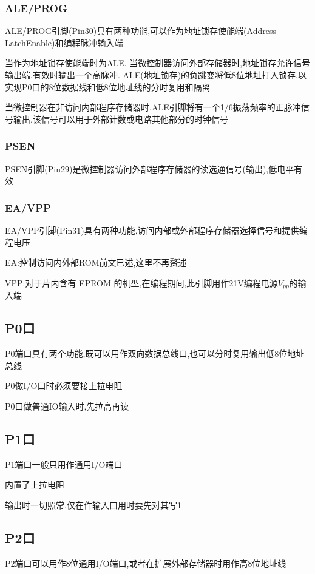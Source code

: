 \documentclass[12pt,a4paper,oneside]{ctexart}
\begin{document}
\subsubsection{ALE/PROG}
ALE/PROG引脚(Pin30)具有两种功能,可以作为地址锁存使能端(Address LatchEnable)和编程脉冲输入端

当作为地址锁存使能端时为ALE.
当微控制器访问外部存储器时,地址锁存允许信号输出端.有效时输出一个高脉冲.
ALE(地址锁存)的负跳变将低8位地址打入锁存.以实现P0口的8位数据线和低8位地址线的分时复用和隔离

当微控制器在非访问内部程序存储器时,ALE引脚将有一个1/6振荡频率的正脉冲信号输出,该信号可以用于外部计数或电路其他部分的时钟信号

\subsubsection{PSEN}
PSEN引脚(Pin29)是微控制器访问外部程序存储器的读选通信号(输出),低电平有效

\subsubsection{EA/VPP}
EA/VPP引脚(Pin31)具有两种功能,访问内部或外部程序存储器选择信号和提供编程电压

EA:控制访问内外部ROM前文已述,这里不再赘述

VPP:对于片内含有 EPROM 的机型,在编程期间,此引脚用作21V编程电源$V_{pp}$的输入端

\subsection{P0口}
P0端口具有两个功能,既可以用作双向数据总线口,也可以分时复用输出低8位地址总线

P0做I/O口时必须要接上拉电阻

P0口做普通IO输入时,先拉高再读

\subsection{P1口}
P1端口一般只用作通用I/O端口

内置了上拉电阻

输出时一切照常,仅在作输入口用时要先对其写1

\subsection{P2口}
P2端口可以用作8位通用I/O端口,或者在扩展外部存储器时用作高8位地址线
\end{document}
